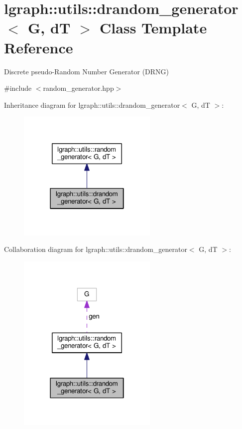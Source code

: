 \hypertarget{classlgraph_1_1utils_1_1drandom__generator}{}\section{lgraph\+:\+:utils\+:\+:drandom\+\_\+generator$<$ G, dT $>$ Class Template Reference}
\label{classlgraph_1_1utils_1_1drandom__generator}


Discrete pseudo-\/\+Random Number Generator (D\+R\+NG)  




{\ttfamily \#include $<$random\+\_\+generator.\+hpp$>$}



Inheritance diagram for lgraph\+:\+:utils\+:\+:drandom\+\_\+generator$<$ G, dT $>$\+:\nopagebreak
\begin{figure}[H]
\begin{center}
\leavevmode
\includegraphics[width=190pt]{classlgraph_1_1utils_1_1drandom__generator__inherit__graph}
\end{center}
\end{figure}


Collaboration diagram for lgraph\+:\+:utils\+:\+:drandom\+\_\+generator$<$ G, dT $>$\+:\nopagebreak
\begin{figure}[H]
\begin{center}
\leavevmode
\includegraphics[width=190pt]{classlgraph_1_1utils_1_1drandom__generator__coll__graph}
\end{center}
\end{figure}

